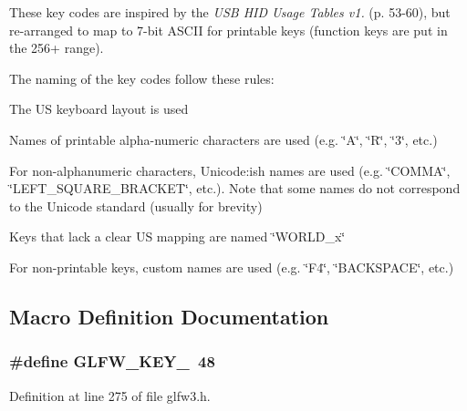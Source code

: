 These key codes are inspired by the {\itshape U\+S\+B H\+I\+D Usage Tables v1.} (p. 53-\/60), but re-\/arranged to map to 7-\/bit A\+S\+C\+I\+I for printable keys (function keys are put in the 256+ range).

The naming of the key codes follow these rules\+:
\begin{DoxyItemize}
\item The U\+S keyboard layout is used
\item Names of printable alpha-\/numeric characters are used (e.\+g. \char`\"{}\+A\char`\"{}, \char`\"{}\+R\char`\"{}, \char`\"{}3\char`\"{}, etc.)
\item For non-\/alphanumeric characters, Unicode\+:ish names are used (e.\+g. \char`\"{}\+C\+O\+M\+M\+A\char`\"{}, \char`\"{}\+L\+E\+F\+T\+\_\+\+S\+Q\+U\+A\+R\+E\+\_\+\+B\+R\+A\+C\+K\+E\+T\char`\"{}, etc.). Note that some names do not correspond to the Unicode standard (usually for brevity)
\item Keys that lack a clear U\+S mapping are named \char`\"{}\+W\+O\+R\+L\+D\+\_\+x\char`\"{}
\item For non-\/printable keys, custom names are used (e.\+g. \char`\"{}\+F4\char`\"{}, \char`\"{}\+B\+A\+C\+K\+S\+P\+A\+C\+E\char`\"{}, etc.) 
\end{DoxyItemize}

\subsection{Macro Definition Documentation}
\hypertarget{group__keys_ga50391730e9d7112ad4fd42d0bd1597c1}{}
\subsubsection[{G\+L\+F\+W\+\_\+\+K\+E\+Y\+\_\+0}]{\setlength{\rightskip}{0pt plus 5cm}\#define G\+L\+F\+W\+\_\+\+K\+E\+Y\+\_~48}\label{group__keys_ga50391730e9d7112ad4fd42d0bd1597c1}


Definition at line 275 of file glfw3.\+h.

\hypertarget{group__keys_ga05e4cae9ddb8d40cf6d82c8f11f2502f}{}
